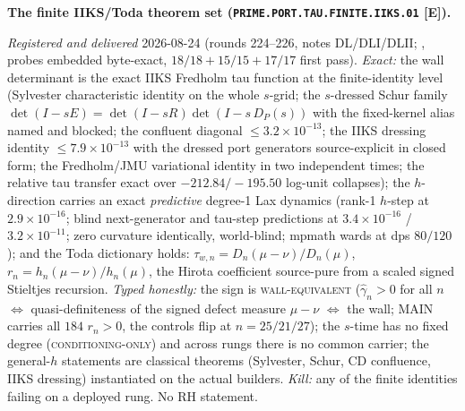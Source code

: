 \par\smallskip\noindent\textbf{The finite IIKS/Toda theorem set
(\texttt{PRIME.PORT.TAU.FINITE.\allowbreak IIKS.01} [E]).}
{\sloppy
\emph{Registered and delivered} 2026-08-24 (rounds 224--226,
notes DL/DLI/DLII;
, probes embedded
byte-exact, $18/18 + 15/15 + 17/17$ first pass).  \emph{Exact:}
the wall determinant is the exact IIKS Fredholm tau function at
the finite-identity level (Sylvester characteristic identity on
the whole $s$-grid; the $s$-dressed Schur family $\det(I - sE) =
\det(I - sR)\det(I - s\,D_P(s))$ with the fixed-kernel alias
named and blocked; the confluent diagonal $\le
3.2\times10^{-13}$; the IIKS dressing identity $\le
7.9\times10^{-13}$ with the dressed port generators
source-explicit in closed form; the Fredholm/JMU variational
identity in two independent times; the relative tau transfer
exact over $-212.84/-195.50$ log-unit collapses); the
$h$-direction carries an exact \emph{predictive} degree-1 Lax
dynamics (rank-1 $h$-step at $2.9\times10^{-16}$; blind
next-generator and tau-step predictions at $3.4\times10^{-16}$ /
$3.2\times10^{-11}$; zero curvature identically, world-blind;
mpmath wards at dps $80/120$); and the Toda dictionary holds:
$\tau_{w,n} = D_n(\mu - \nu)/D_n(\mu)$, $r_n = h_n(\mu -
\nu)/h_n(\mu)$, the Hirota coefficient source-pure from a scaled
signed Stieltjes recursion.  \emph{Typed honestly:} the sign is
\textsc{wall-equivalent} ($\hat\gamma_n > 0$ for all $n$ $\iff$
quasi-definiteness of the signed defect measure $\mu - \nu$
$\iff$ the wall; MAIN carries all $184$ $r_n > 0$, the controls
flip at $n = 25/21/27$); the $s$-time has no fixed degree
(\textsc{conditioning-only}) and across rungs there is no common
carrier; the general-$h$ statements are classical theorems
(Sylvester, Schur, CD confluence, IIKS dressing) instantiated on
the actual builders.  \emph{Kill:} any of the finite identities
failing on a deployed rung.  No RH statement.\par}


